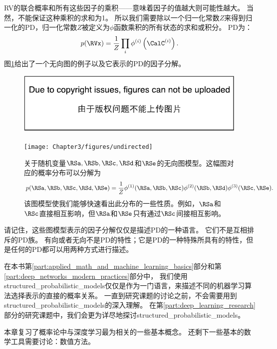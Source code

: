 \gls{RV}的联合概率和所有这些因子的乘积——意味着因子的值越大则可能性越大。
当然，不能保证这种乘积的求和为1。
所以我们需要除以一个归一化常数$Z$来得到归一化的\gls{PD}，归一化常数$Z$被定义为$\phi$函数乘积的所有状态的求和或积分。
\gls{PD}为：
\begin{equation}
p(\RVx) = \frac{1}{Z} \prod_i \phi^{(i)} \left (\CalC^{(i)} \right).
\end{equation}
图\ref{fig:chap3_undirected}给出了一个无向图的例子以及它表示的\gls{PD}的因子分解。
\begin{figure}[!htb]
\ifOpenSource
\centerline{\includegraphics{figure.pdf}}
\else
\centerline{\texttt{[image: Chapter3/figures/undirected]}}
\fi
\captionsetup{singlelinecheck=off}
\caption[.]{关于随机变量$\RSa, \RSb, \RSc, \RSd$和$\RSe$的无向图模型。这幅图对应的概率分布可以分解为
\begin{equation}
p(\RSa, \RSb, \RSc, \RSd, \RSe) = \frac{1}{Z} \phi^{(1)} (\RSa, \RSb, \RSc) \phi^{(2)}(\RSb, \RSd) \phi^{(3)} (\RSc, \RSe).
\end{equation}
该图模型使我们能够快速看出此分布的一些性质。例如，$\RSa$和$\RSc$直接相互影响，但$\RSa$和$\RSe$只有通过$\RSc$间接相互影响。
}
\label{fig:chap3_undirected}
\end{figure}



请记住，这些图模型表示的因子分解仅仅是描述\gls{PD}的一种语言。
它们不是互相排斥的\gls{PD}族。
有向或者无向不是\gls{PD}的特性；它是\gls{PD}的一种特殊所具有的特性，但是任何的\gls{PD}都可以用两种方式进行描述。

在本书第\ref{part:applied_math_and_machine_learning_basics}部分和第\ref{part:deep_networks_modern_practices}部分中， 我们使用\gls{structured_probabilistic_models}仅仅是作为一门语言，来描述不同的机器学习算法选择表示的直接的概率关系。
一直到研究课题的讨论之前，不会需要用到\gls{structured_probabilistic_models}的深入理解。
在第\ref{part:deep_learning_research}部分的研究课题中，我们会更为详尽地探讨\gls{structured_probabilistic_models}。

本章复习了概率论中与深度学习最为相关的一些基本概念。
还剩下一些基本的数学工具需要讨论：数值方法。


